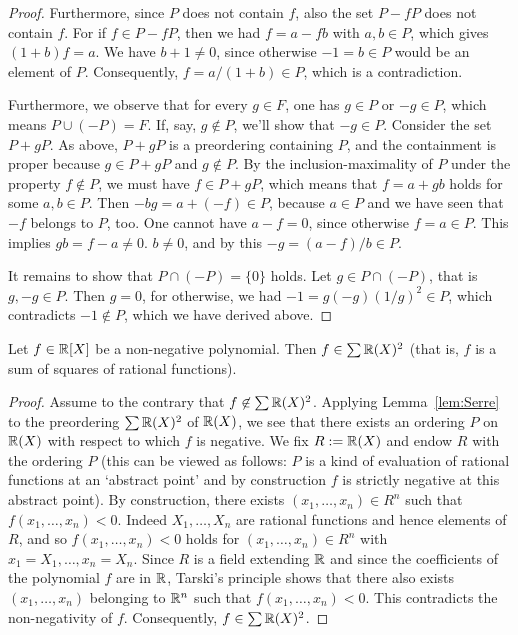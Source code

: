 \begin{proof}
	Furthermore, since $P$ does not contain $f$, also the set $P - fP$ does not contain $f$. For if $f \in P - fP$, then we had $f = a - f b$ with $a, b \in P$, which gives $(1+b) f = a$. We have $b+1 \ne 0$, since otherwise $-1 = b \in P$ would be an element of $P$. Consequently, $ f= a / (1+b) \in P$, which is a contradiction.
	
	Furthermore, we observe that for every $g \in F$, one has $g \in P$ or $-g \in P$, which means $P \cup (-P) = F$. 
	If, say, $g \not \in P$, we'll show that $-g \in P$. Consider the set $P + g P$. As above, $P + g P$ is a preordering containing $P$, and the containment is proper because $g \in P+ gP$ and $g \not\in P$. By the inclusion-maximality of $P$ under the property $f \not\in P$, we must have $f \in P + gP$, which means that $f = a + g b$ holds for some $a,b \in P$. Then $ - b g = a + (-f) \in P$, because $a \in P$ and we have seen that $-f$ belongs to $P$, too. One cannot have $a - f= 0 $, since otherwise $f = a \in P$. This implies $g b = f -a  \ne 0$.  $b \ne 0$, and by this $-g = (a-f) / b \in P$. 
	
	It remains to show that $P \cap (-P) = \{0\}$ holds. Let $g \in P \cap (-P)$, that is $g, - g \in P$. Then $g =0$, for otherwise, we had $-1 = g (-g) (1/g)^2 \in P$, which contradicts $-1 \not\in P$, which we have derived above. 
\end{proof}

\begin{theorem}[Artin 1927] Let $f \in \mathbb{R}[X]$ be a non-negative polynomial. Then $f \in \sum \mathbb{R}(X)^2$ (that is, $f$ is a sum of squares of rational functions). 
\end{theorem}
\begin{proof}
	Assume to the contrary that $f \not \in \sum \mathbb{R}(X)^2$. Applying Lemma~\ref{lem:Serre} to the preordering $\sum \mathbb{R}(X)^2$ of $\mathbb{R}(X)$, we see that there exists an ordering $P$ on $\mathbb{R}(X)$ with respect to which $f$ is negative. We fix $R := \mathbb{R}(X)$ and endow $R$ with the ordering $P$ (this can be viewed as follows: $P$ is a kind of evaluation of rational functions at an `abstract point' and by construction $f$ is strictly negative at this abstract point). By construction, there exists $(x_1,\ldots,x_n) \in R^n$ such that $f(x_1,\ldots,x_n) < 0$. Indeed $X_1,\ldots,X_n$ are rational functions and hence elements of $R$, and so $f(x_1,\ldots,x_n) < 0$ holds for $(x_1,\ldots,x_n) \in R^n$ with $x_1=X_1,\ldots,x_n=X_n$. Since $R$ is a field extending $\mathbb{R}$ and since the coefficients of the polynomial $f$ are in $\mathbb{R}$, Tarski's principle  shows that there also exists $(x_1,\ldots,x_n)$ belonging to $\mathbb{R}^n$ such that $f(x_1,\ldots,x_n) < 0$. This contradicts the non-negativity of $f$. Consequently, $f \in \sum \mathbb{R}(X)^2$. 
\end{proof}

